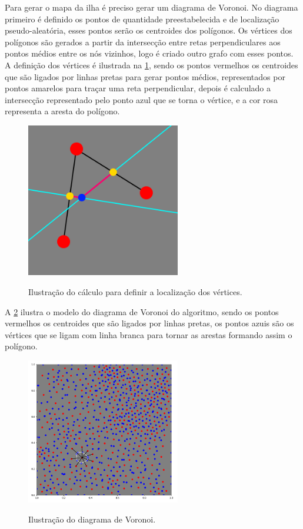 Para gerar o mapa da ilha é preciso gerar um diagrama de Voronoi. No diagrama primeiro é definido os pontos de quantidade preestabelecida e de localização pseudo-aleatória, esses pontos serão os centroides dos polígonos. Os vértices dos polígonos são gerados a partir da intersecção entre retas perpendiculares aos pontos médios entre os nós vizinhos, logo é criado outro grafo com esses pontos. A definição dos vértices é ilustrada na \cref{fig:explicacao_vertice}, sendo os pontos vermelhos os centroides que são ligados por linhas pretas para gerar pontos médios, representados por pontos amarelos para traçar uma reta perpendicular, depois é calculado a intersecção representado pelo ponto azul que se torna o vértice, e a cor rosa representa a aresta do polígono.

\begin{figure}[!ht]
	\centering
    \caption{Ilustração do cálculo para definir a localização dos vértices.}
	\includegraphics[width=0.6\textwidth]{figures/explicacao_vertice.png}
	\label{fig:explicacao_vertice}
\end{figure}

A \cref{fig:diagrama_voronoi_pontos} ilustra o modelo do diagrama de Voronoi do algoritmo, sendo os pontos vermelhos os centroides que são ligados por linhas pretas, os pontos azuis são os vértices que se ligam com linha branca para tornar as arestas formando assim o polígono.

\begin{figure}[!ht]
	\centering
    \caption{Ilustração do diagrama de Voronoi.}
	\includegraphics[width=0.6\textwidth]{figures/diagrama_voronoi_pontos.png}
	\label{fig:diagrama_voronoi_pontos}
\end{figure}

